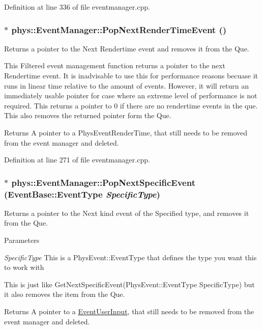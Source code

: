 Definition at line 336 of file eventmanager.cpp.

\hypertarget{classphys_1_1EventManager_aa7e800d34ad8b9295ac87dfa822a2a03}{
\subsubsection[{PopNextRenderTimeEvent}]{ $\ast$ phys::EventManager::PopNextRenderTimeEvent ()}}
\label{da/dde/classphys_1_1EventManager_aa7e800d34ad8b9295ac87dfa822a2a03}


Returns a pointer to the Next Rendertime event and removes it from the Que. 

This Filtered event management function returns a pointer to the next Rendertime event. It is inadvisable to use this for performance reasons becuase it runs in linear time relative to the amount of events. However, it will return an immediately usable pointer for case where an extreme level of performance is not required. This returns a pointer to 0 if there are no rendertime events in the que. This also removes the returned pointer form the Que. \begin{DoxyReturn}{Returns}
A pointer to a PhysEventRenderTime, that still needs to be removed from the event manager and deleted. 
\end{DoxyReturn}


Definition at line 271 of file eventmanager.cpp.

\hypertarget{classphys_1_1EventManager_a156ba3c53cc799499272430111bbdfa4}{
\subsubsection[{PopNextSpecificEvent}]{ $\ast$ phys::EventManager::PopNextSpecificEvent ({\bf EventBase::EventType} {\em SpecificType})}}
\label{da/dde/classphys_1_1EventManager_a156ba3c53cc799499272430111bbdfa4}


Returns a pointer to the Next kind event of the Specified type, and removes it from the Que. 


\begin{DoxyParams}{Parameters}
\item[{\em SpecificType}]This is a PhysEvent::EventType that defines the type you want this to work with\end{DoxyParams}
This is just like GetNextSpecificEvent(PhysEvent::EventType SpecificType) but it also removes the item from the Que. \begin{DoxyReturn}{Returns}
A pointer to a \hyperlink{classphys_1_1EventUserInput}{EventUserInput}, that still needs to be removed from the event manager and deleted. 
\end{DoxyReturn}


